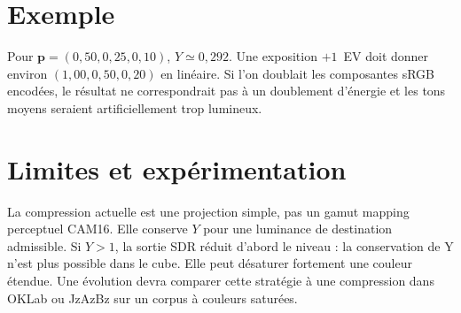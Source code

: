 \section{Exemple}
Pour $\mathbf{p}=(0{,}50,0{,}25,0{,}10)$, $Y\simeq0{,}292$. Une exposition $+1$~EV doit donner environ $(1{,}00,0{,}50,0{,}20)$ en linéaire. Si l'on doublait les composantes sRGB encodées, le résultat ne correspondrait pas à un doublement d'énergie et les tons moyens seraient artificiellement trop lumineux.

\section{Limites et expérimentation}
La compression actuelle est une projection simple, pas un gamut mapping perceptuel CAM16. Elle conserve $Y$ pour une luminance de destination admissible. Si $Y>1$, la sortie SDR réduit d'abord le niveau : la conservation de Y n'est plus possible dans le cube. Elle peut désaturer fortement une couleur étendue. Une évolution devra comparer cette stratégie à une compression dans OKLab ou JzAzBz sur un corpus à couleurs saturées.




